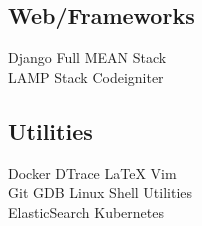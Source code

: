 \documentclass[]{deedy-resume-openfont}
\begin{document}
\begin{minipage}[t]{0.30\textwidth}
\subsection{Web/Frameworks}
Django \textbullet{} Full MEAN Stack \\
LAMP Stack \textbullet{} Codeigniter \\
\vspace{0.4 cm}
\subsection{Utilities}
Docker \textbullet{} DTrace \textbullet{} \LaTeX{} \textbullet{} Vim \\
Git \textbullet{} GDB \textbullet{} Linux Shell Utilities \\
ElasticSearch \textbullet{} Kubernetes \\


%
%

\end{minipage}
\hfill
\end{document}
